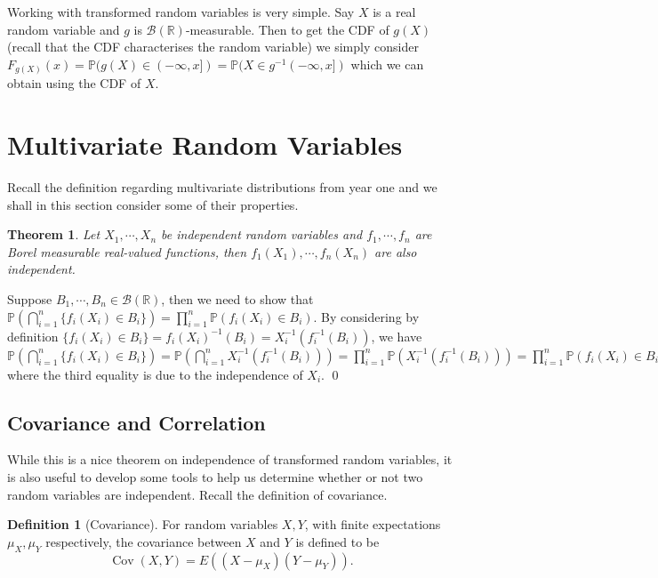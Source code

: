\documentclass[
]{article}
\newtheorem{theorem}{Theorem}
\theoremstyle{definition}
\newtheorem{definition}{Definition}[section]
\begin{document}
Working with transformed random variables is very simple. Say \(X\) is a
real random variable and \(g\) is
\(\mathcal{B}(\mathbb{R})\)-measurable. Then to get the CDF of \(g(X)\)
(recall that the CDF characterises the random variable) we simply
consider
\(F_{g(X)}(x) = \mathbb{P}(g(X) \in (-\infty, x]) = \mathbb{P}(X \in g^{-1}(-\infty, x])\)
which we can obtain using the CDF of \(X\).

\newpage

\hypertarget{multivariate-random-variables}{%
\section{Multivariate Random
Variables}\label{multivariate-random-variables}}

Recall the definition regarding multivariate distributions from year one
and we shall in this section consider some of their properties.

\begin{theorem}
  Let \(X_1, \cdots, X_n\) be independent random variables and \(f_1, \cdots, f_n\) 
  are Borel measurable real-valued functions, then \(f_1(X_1), \cdots, f_n(X_n)\) 
  are also independent.  
\end{theorem}
\proof

Suppose \(B_1, \cdots, B_n \in \mathcal{B}(\mathbb{R})\), then we need
to show that
\(\mathbb{P}(\bigcap_{i = 1}^n\{f_i(X_i) \in B_i\})  = \prod_{i = 1}^n \mathbb{P}(f_i(X_i) \in B_i)\).
By considering by definition
\(\{f_i(X_i) \in B_i\} = f_i(X_i)^{-1}(B_i) = X_i^{-1}(f_i^{-1}(B_i))\),
we have
\(\mathbb{P}(\bigcap_{i = 1}^n\{f_i(X_i) \in B_i\}) =  \mathbb{P}(\bigcap_{i = 1}^n X_i^{-1}(f_i^{-1}(B_i))) =  \prod_{i = 1}^n \mathbb{P}(X_i^{-1}(f_i^{-1}(B_i))) =  \prod_{i = 1}^n \mathbb{P}(f_i(X_i) \in B_i)\)
where the third equality is due to the independence of \(X_i\). \qed

\hypertarget{covariance-and-correlation}{%
\subsection{Covariance and
Correlation}\label{covariance-and-correlation}}

While this is a nice theorem on independence of transformed random
variables, it is also useful to develop some tools to help us determine
whether or not two random variables are independent. Recall the
definition of covariance.

\begin{definition}[Covariance]
  For random variables \(X, Y\), with finite expectations \(\mu_X, \mu_Y\) 
  respectively, the covariance between \(X\) and \(Y\) is defined to be 
  \[\mathop{\mathrm{Cov}}(X, Y) = E((X - \mu_X) (Y - \mu_Y)).\]
\end{definition}
\end{document}
